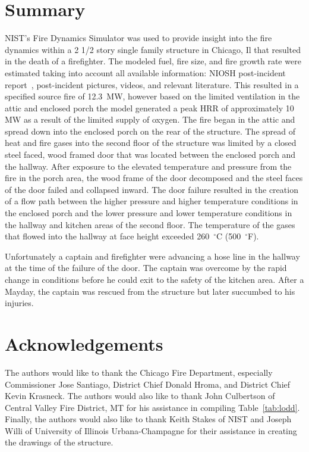 \documentclass[11pt,oneside]{book}
\begin{document}
\chapter{Summary}
NIST's Fire Dynamics Simulator was used to provide insight into the fire dynamics within a 2 1/2 story single family structure in Chicago, Il that resulted in the death of a firefighter. The modeled fuel, fire size, and fire growth rate were estimated taking into account all available information: NIOSH post-incident report~\cite{NIOSH:Bowyer}, post-incident pictures, videos, and relevant literature. This resulted in a specified source fire of 12.3~MW, however based on the limited ventilation in the attic and enclosed porch the model generated a peak HRR of approximately 10 MW as a result of the limited supply of oxygen.  The fire began in the attic and spread down into the enclosed porch on the rear of the structure.  The spread of heat and fire gases into the second floor of the structure was limited by a closed steel faced, wood framed door that was located between the enclosed porch and the hallway.  After exposure to the elevated temperature and pressure from the fire in the porch area, the wood frame of the door decomposed and the steel faces of the door failed and collapsed inward.  The door failure resulted in the creation of a flow path between the higher pressure and higher temperature conditions in the enclosed porch and the lower pressure and lower temperature conditions in the hallway and kitchen areas of the second floor.  The temperature of the gases that flowed into the hallway at face height exceeded 260~$^{\circ}$C (500~$^{\circ}$F). 

Unfortunately a captain and firefighter were advancing a hose line in the hallway at the time of the failure of the door.  The captain was overcome by the rapid change in conditions before he could exit to the safety of the kitchen area.  After a Mayday, the captain was rescued from the structure but later succumbed to his injuries.


\chapter{Acknowledgements}
The authors would like to thank the Chicago Fire Department, especially Commissioner Jose Santiago, District Chief Donald Hroma, and District Chief Kevin Krasneck. The authors would also like to thank John Culbertson of Central Valley Fire District, MT for his assistance in compiling Table~\ref{tab:lodd}. Finally, the authors would also like to thank Keith Stakes of NIST and Joseph Willi of University of Illinois Urbana-Champagne for their assistance in creating the drawings of the structure.
\end{document}
